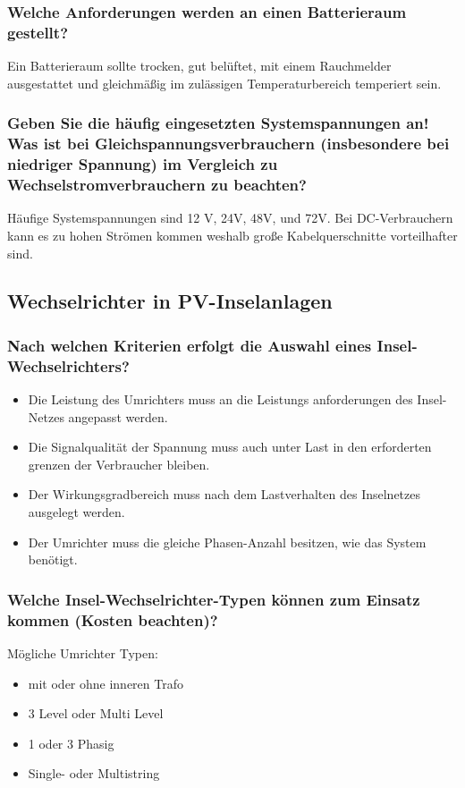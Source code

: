 \subsubsection{Welche Anforderungen werden an einen Batterieraum gestellt?}
Ein Batterieraum sollte trocken, gut belüftet, mit einem Rauchmelder ausgestattet und gleichmäßig im zulässigen Temperaturbereich temperiert sein.
\subsubsection{Geben Sie die häufig eingesetzten Systemspannungen an! Was ist bei Gleichspannungsverbrauchern (insbesondere bei niedriger Spannung) im Vergleich zu Wechselstromverbrauchern zu beachten?}
Häufige Systemspannungen sind 12 V, 24V, 48V, und 72V.
Bei DC-Verbrauchern kann es zu hohen Strömen kommen weshalb große Kabelquerschnitte vorteilhafter sind.


\subsection{Wechselrichter in PV-Inselanlagen}
\subsubsection{Nach welchen Kriterien erfolgt die Auswahl eines Insel-Wechselrichters?}
\begin{itemize}
    \item Die Leistung des Umrichters muss an die Leistungs anforderungen des Insel-Netzes angepasst werden.
    \item Die Signalqualität der Spannung muss auch unter Last in den erforderten grenzen der Verbraucher bleiben.
    \item Der Wirkungsgradbereich muss nach dem Lastverhalten des Inselnetzes ausgelegt werden.
    \item Der Umrichter muss die gleiche Phasen-Anzahl besitzen, wie das System benötigt.
\end{itemize}
\subsubsection{Welche Insel-Wechselrichter-Typen können zum Einsatz kommen (Kosten beachten)?}
Mögliche Umrichter Typen:
\begin{itemize}
    \item mit oder ohne inneren Trafo
    \item 3 Level oder Multi Level
    \item 1 oder 3 Phasig
    \item Single- oder Multistring
\end{itemize} 
